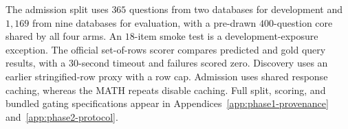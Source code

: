 The admission split uses $365$ questions from two databases for
development and $1{,}169$ from nine databases for evaluation, with a
pre-drawn $400$-question core shared by all four arms. An $18$-item
smoke test is a development-exposure exception. The official set-of-rows
scorer compares predicted and gold query results, with a $30$-second
timeout and failures scored zero. Discovery uses an earlier
stringified-row proxy with a row cap. Admission uses shared response
caching, whereas the MATH repeats disable caching. Full split, scoring,
and bundled gating specifications appear in
Appendices~\ref{app:phase1-provenance} and~\ref{app:phase2-protocol}.
